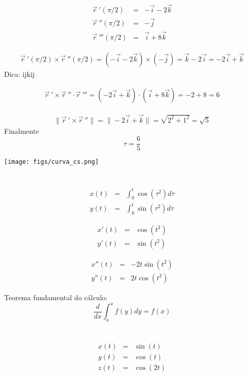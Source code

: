 \documentclass[a4paper,10pt]{book}
\begin{document}
 \begin{eqnarray*}
  \vec{r}\!~'(\pi/2) &=& -\vec{i}-
  2\vec{k}\\
  \vec{r}\!~''(\pi/2) &=& -\vec{j}\\
  \vec{r}\!~'''(\pi/2) &=& \vec{i}+
  8\vec{k}
 \end{eqnarray*}

 
 \begin{eqnarray*}
\vec{r}\!~'(\pi/2)\times \vec{r}\!~''(\pi/2)=\left(-\vec{i}-
  2\vec{k}\right)\times (-\vec{j})=\vec{k}-2\vec{i}=-2\vec{i}+\vec{k}
  \end{eqnarray*}
 Dica: ijkij
 
\begin{eqnarray*}
   \vec{r}\!~'\times\vec{r}\!~''\cdot \vec{r}\!~'''= \left(-2\vec{i}+\vec{k}\right)\cdot \left(\vec{i}+8\vec{k}\right)= -2+8=6
  \end{eqnarray*}
 

 \begin{eqnarray*}
\|\vec{r}\!~' \times \vec{r}\!~''\|=\|-2\vec{i}+\vec{k}\|=\sqrt{2^2+1^2}=\sqrt{5}
 \end{eqnarray*}
 Finalmente
 $$\tau=\frac{6}{5}$$


 \begin{center}
 \texttt{[image: figs/curva\_cs.png]}
 \end{center}
 
 \section{}
\begin{eqnarray*}
  x(t) &=& \int_0^t\cos(\tau^2)d\tau\\
  y(t) &=& \int_0^t\sin(\tau^2)d\tau
\end{eqnarray*}
 
\begin{eqnarray*}
  x'(t) &=& \cos(t^2)\\
  y'(t) &=& \sin(t^2)
\end{eqnarray*}

\begin{eqnarray*}
  x''(t) &=& -2t\sin(t^2)\\
  y''(t) &=& 2t\cos(t^2)
\end{eqnarray*}

Teorema fundamental do cálculo:
$$\frac{d}{dx} \int_a^x f(y)dy = f(x)$$
 
 
 \section{}
 \begin{eqnarray*}
  x(t) &=& \sin(t)\\
  y(t) &=& \cos(t)\\
  z(t) &=& \cos(2t)
 \end{eqnarray*}
 
\end{document}
